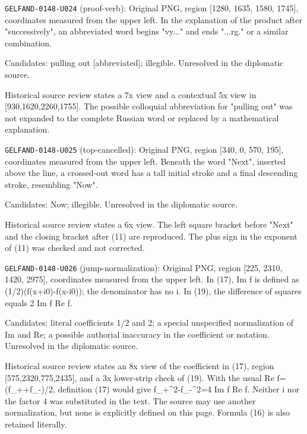 \noindent\texttt{GELFAND-0148-U024} (proof-verb): Original PNG, region [1280, 1635, 1580, 1745], coordinates measured from the upper left. In the explanation of the product after "successively", an abbreviated word begins "vy..." and ends "...rg." or a similar combination.\par
Candidates: pulling out [abbreviated]; illegible. Unresolved in the diplomatic source.\par
Historical source review states a 7x view and a contextual 5x view in [930,1620,2260,1755]. The possible colloquial abbreviation for "pulling out" was not expanded to the complete Russian word or replaced by a mathematical explanation.\par

\noindent\texttt{GELFAND-0148-U025} (top-cancelled): Original PNG, region [340, 0, 570, 195], coordinates measured from the upper left. Beneath the word "Next", inserted above the line, a crossed-out word has a tall initial stroke and a final descending stroke, resembling "Now".\par
Candidates: Now; illegible. Unresolved in the diplomatic source.\par
Historical source review states a 6x view. The left square bracket before "Next" and the closing bracket after (11) are reproduced. The plus sign in the exponent of (11) was checked and not corrected.\par

\noindent\texttt{GELFAND-0148-U026} (jump-normalization): Original PNG, region [225, 2310, 1420, 2975], coordinates measured from the upper left. In (17), Im f is defined as (1/2)(f(x+i0)-f(x-i0)); the denominator has no i. In (19), the difference of squares equals 2 Im f Re f.\par
Candidates: literal coefficients 1/2 and 2; a special unspecified normalization of Im and Re; a possible authorial inaccuracy in the coefficient or notation. Unresolved in the diplomatic source.\par
Historical source review states an 8x view of the coefficient in (17), region [575,2320,775,2435], and a 3x lower-strip check of (19). With the usual Re f=(f\_++f\_-)/2, definition (17) would give f\_+\textasciicircum{}2-f\_-\textasciicircum{}2=4 Im f Re f. Neither i nor the factor 4 was substituted in the text. The source may use another normalization, but none is explicitly defined on this page. Formula (16) is also retained literally.\par

